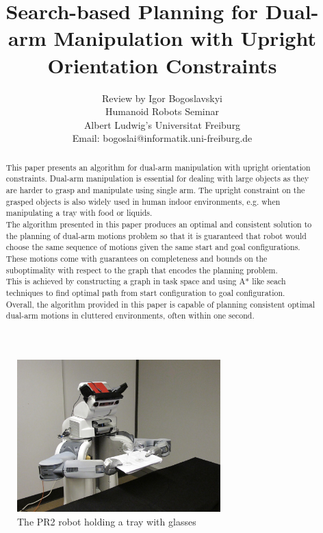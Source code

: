 \documentclass[11pt]{article}
\title{\textbf{Search-based Planning for Dual-arm Manipulation with Upright Orientation Constraints}}
\author{Review by Igor Bogoslavskyi\\
		Humanoid Robots Seminar\\Albert Ludwig's Universitat Freiburg\\
Email: bogoslai@informatik.uni-freiburg.de}
\date{}
\begin{document}
\maketitle

\begin{abstract}
This paper presents an algorithm for dual-arm manipulation with upright orientation constraints. Dual-arm manipulation is essential for dealing with large objects as they are harder to grasp and manipulate using single arm. The upright constraint on the grasped objects is also widely used in human indoor environments, e.g. when manipulating a tray with food or liquids.\\
The algorithm presented in this paper produces an optimal and consistent solution to the planning of dual-arm motions problem so that it is guaranteed that robot would choose the same sequence of motions given the same start and goal configurations. These motions come with guarantees on completeness and bounds on the suboptimality with respect to the graph that encodes the planning problem.\\
This is achieved by constructing a graph in task space and using A* like seach techniques to find optimal path from start configuration to goal configuration.\\
Overall, the algorithm provided in this paper is capable of planning consistent optimal dual-arm motions in cluttered environments, often within one second.

\end{abstract}

\begin{figure}[htb]
\centering
\includegraphics[width=0.7\textwidth]{dual-000.jpg}
\caption{The PR2 robot holding a tray with glasses}
\label{fig:PR2 with glasses}
\end{figure}
\end{document}
